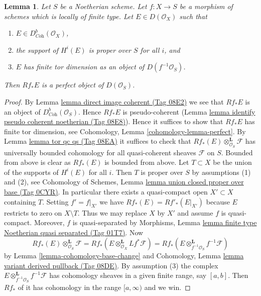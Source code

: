 \documentclass{amsart}
\theoremstyle{plain}
\newtheorem{lemma}[subsection]{Lemma}
\theoremstyle{definition}
\theoremstyle{remark}
\numberwithin{equation}{subsection}
\begin{document}
\begin{lemma}
\label{lemma-perfect-direct-image}
Let $S$ be a Noetherian scheme. Let $f : X \to S$ be a morphism of schemes
which is locally of finite type. Let $E \in D(\mathcal{O}_X)$ such that
\begin{enumerate}
\item $E \in D^b_{\textit{Coh}}(\mathcal{O}_X)$,
\item the support of $H^i(E)$ is proper over $S$ for all $i$, and
\item $E$ has finite tor dimension as an object of $D(f^{-1}\mathcal{O}_S)$.
\end{enumerate}
Then $Rf_*E$ is a perfect object of $D(\mathcal{O}_S)$.
\end{lemma}

\begin{proof}
By Lemma \href{https://stacks.math.columbia.edu/tag/08E2}{lemma direct image coherent (Tag 08E2)} we see that $Rf_*E$ is an object of
$D^b_{\textit{Coh}}(\mathcal{O}_S)$. Hence $Rf_*E$ is pseudo-coherent
(Lemma \href{https://stacks.math.columbia.edu/tag/08E8}{lemma identify pseudo coherent noetherian (Tag 08E8)}).
Hence it suffices to show that $Rf_*E$ has finite tor dimension, see
Cohomology, Lemma \ref{cohomology-lemma-perfect}.
By Lemma \href{https://stacks.math.columbia.edu/tag/08EA}{lemma tor qc qs (Tag 08EA)} it suffices to check that
$Rf_*(E) \otimes_{\mathcal{O}_S}^\mathbf{L} \mathcal{F}$
has universally bounded cohomology for all quasi-coherent
sheaves $\mathcal{F}$ on $S$. Bounded from above is clear as $Rf_*(E)$
is bounded from above. Let $T \subset X$ be the union of the supports
of $H^i(E)$ for all $i$. Then $T$ is proper over $S$ by assumptions
(1) and (2), see Cohomology of Schemes, Lemma
\href{https://stacks.math.columbia.edu/tag/0CYR}{lemma union closed proper over base (Tag 0CYR)}.
In particular there exists a quasi-compact open
$X' \subset X$ containing $T$. Setting $f' = f|_{X'}$ we have
$Rf_*(E) = Rf'_*(E|_{X'})$ because $E$ restricts to zero on $X \setminus T$.
Thus we may replace $X$ by $X'$ and assume $f$ is quasi-compact.
Moreover, $f$ is quasi-separated by Morphisms, Lemma
\href{https://stacks.math.columbia.edu/tag/01T7}{lemma finite type Noetherian quasi separated (Tag 01T7)}. Now
$$
Rf_*(E) \otimes_{\mathcal{O}_S}^\mathbf{L} \mathcal{F} =
Rf_*\left(E \otimes_{\mathcal{O}_X}^\mathbf{L} Lf^*\mathcal{F}\right) =
Rf_*\left(E \otimes_{f^{-1}\mathcal{O}_S}^\mathbf{L} f^{-1}\mathcal{F}\right)
$$
by
Lemma \ref{lemma-cohomology-base-change}
and
Cohomology, Lemma \href{https://stacks.math.columbia.edu/tag/08DE}{lemma variant derived pullback (Tag 08DE)}.
By assumption (3) the complex
$E \otimes_{f^{-1}\mathcal{O}_S}^\mathbf{L} f^{-1}\mathcal{F}$
has cohomology sheaves in a
given finite range, say $[a, b]$. Then $Rf_*$ of it
has cohomology in the range $[a, \infty)$ and we win.
\end{proof}
\end{document}
